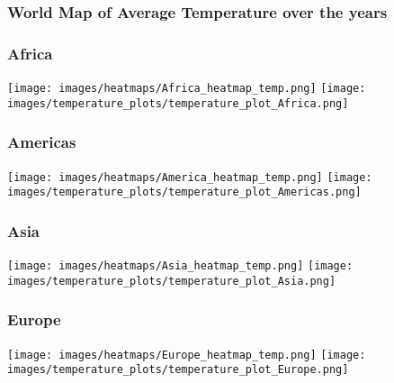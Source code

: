 \documentclass[handout, xcolor=dvipsnames]{beamer}
\begin{document}
\begin{frame}
	\frametitle{World Map of Average Temperature over the years}
	\begin{center} 
	\end{center}
\end{frame}

\begin{frame}
	\frametitle{Africa}
	\begin{center} 
		\texttt{[image: images/heatmaps/Africa\_heatmap\_temp.png]} \hspace{1pt}
            \texttt{[image: images/temperature\_plots/temperature\_plot\_Africa.png]} \hspace{1pt}
	\end{center}
\end{frame}
    
\begin{frame}
	\frametitle{Americas}
	\begin{center} 
		\texttt{[image: images/heatmaps/America\_heatmap\_temp.png]} \hspace{1pt}
            \texttt{[image: images/temperature\_plots/temperature\_plot\_Americas.png]} \hspace{1pt}
	\end{center}
\end{frame}
    
\begin{frame}
	\frametitle{Asia}
	\begin{center} 
		\texttt{[image: images/heatmaps/Asia\_heatmap\_temp.png]} \hspace{1pt}
            \texttt{[image: images/temperature\_plots/temperature\_plot\_Asia.png]} \hspace{1pt}
	\end{center}
\end{frame}
    
\begin{frame}
	\frametitle{Europe}
	\begin{center} 
		\texttt{[image: images/heatmaps/Europe\_heatmap\_temp.png]} \hspace{1pt}
            \texttt{[image: images/temperature\_plots/temperature\_plot\_Europe.png]} \hspace{1pt}
	\end{center}
\end{frame}
    
\end{document}

